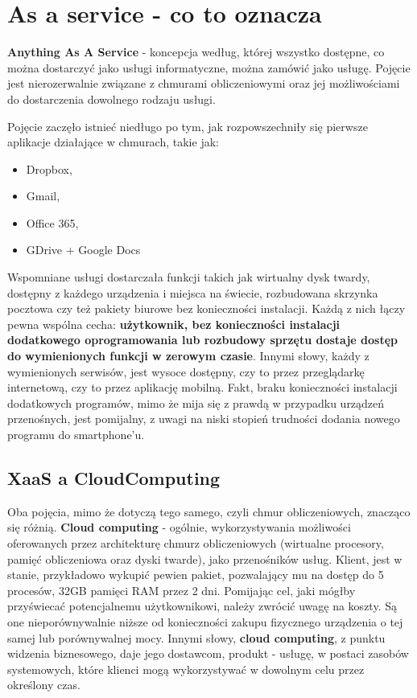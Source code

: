 \section{As a service - co to oznacza}
\label{chapter:monitoring_architecture:xaas}

\textbf{Anything As A Service} - koncepcja według, której wszystko dostępne, co można dostarczyć
jako usługi informatyczne, można zamówić jako usługę. Pojęcie jest nierozerwalnie związane z chmurami
obliczeniowymi oraz jej możliwościami do dostarczenia dowolnego rodzaju usługi.

Pojęcie zaczęło istnieć niedługo po tym, jak rozpowszechniły się pierwsze aplikacje działające w chmurach, takie jak:
\begin{itemize}
    \item Dropbox,
    \item Gmail,
    \item Office 365,
    \item GDrive + Google Docs
   \end{itemize}
Wspomniane usługi dostarczała funkcji takich jak 
wirtualny dysk twardy, dostępny z każdego urządzenia i miejsca na świecie, rozbudowana skrzynka pocztowa czy też pakiety biurowe bez konieczności instalacji.
Każdą z nich łączy pewna wspólna cecha: \textbf{użytkownik, bez konieczności instalacji dodatkowego oprogramowania lub rozbudowy sprzętu dostaje dostęp do wymienionych funkcji w zerowym czasie}. Innymi słowy, każdy z wymienionych serwisów,
jest wysoce dostępny, czy to przez przeglądarkę internetową, czy to przez aplikację mobilną. Fakt, braku konieczności instalacji dodatkowych programów, mimo że mija się z prawdą w przypadku urządzeń przenośnych, jest pomijalny, z uwagi na niski stopień
trudności dodania nowego programu do smartphone'u.

\subsection{XaaS a CloudComputing}
Oba pojęcia, mimo że dotyczą tego samego, czyli chmur obliczeniowych, znacząco się różnią. \textbf{Cloud computing} - ogólnie, wykorzystywania możliwości
oferowanych przez architekturę chmurz obliczeniowych (wirtualne procesory, pamięć obliczeniowa oraz dyski twarde), jako przenośników usług. Klient, jest w stanie, przykładowo wykupić pewien pakiet, pozwalający mu na dostęp do 5 procesów, 32GB pamięci RAM przez 2 dni. Pomijając cel, jaki mógłby przyświecać potencjalnemu użytkownikowi, należy zwrócić uwagę na koszty. Są one nieporównywalnie niższe od konieczności zakupu fizycznego urządzenia
o tej samej lub porównywalnej mocy. Innymi słowy, \textbf{cloud computing}, z punktu widzenia biznesowego, daje jego dostawcom, produkt - usługę, w postaci zasobów systemowych, które klienci mogą wykorzystywać w dowolnym celu przez określony czas.

